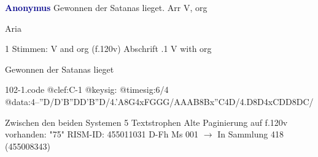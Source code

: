 \documentclass[twocolumn]{book}
\begin{document}
\newline \par \vspace{7pt} \textcolor{darkblue}{\textbf{Anonymus  }}
\newline Gewonnen der Satanas lieget. Arr
\newline V, org
\newline \begin{itshape}[f.120v, heading:] Aria\end{itshape} 
\newline \textcolor{darkblue}{}  1 Stimmen: V and org  (f.120v)
\newline Abschrift
.1  V with org
\newline \begin{footnotesize} Gewonnen der Satanas lieget \end{footnotesize}  
\begin{filecontents*}{102-1.code}
@clef:C-1
@keysig:
@timesig:6/4
@data:4--''D/D'B''DD'B''D/4.'A8G4xFGGG/AAAB{8Bx''C}4D/4.D8D4xCDD{8DC}/
\end{filecontents*}
\newline
%
\newline Zwischen den beiden Systemen 5 Textstrophen
\newline Alte Paginierung auf f.120v vorhanden: "75"
\newline RISM-ID: 455011031
\newline D-Fh  Ms 001
\newline $\rightarrow$ In Sammlung 418 (455008343)
      
\end{document}
